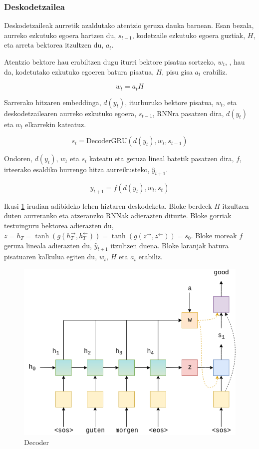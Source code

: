 \documentclass[11pt,a4paper]{article}
\begin{document}
\subsubsection{Deskodetzailea}
Deskodetzaileak aurretik azaldutako atentzio geruza dauka barnean. Esan bezala, aurreko ezkutuko egoera hartzen du, $s_{t-1}$, kodetzaile ezkutuko egoera guztiak, $H$, eta arreta bektorea itzultzen du, $a_t$.

Atentzio bektore hau erabiltzen dugu iturri bektore pisatua sortzeko, $w_t$, , hau da, kodetutako ezkutuko egoeren batura pisatua, $H$, pisu gisa $a_t$ erabiliz.

$$w_t = a_t H$$

Sarrerako hitzaren embeddinga, $d(y_t)$, iturburuko bektore pisatua, $w_t$, eta deskodetzailearen aurreko ezkutuko egoera, $s_{t-1}$, RNNra pasatzen dira, $d(y_t)$ eta $w_t$ elkarrekin kateatuz.

$$s_t = \text{DecoderGRU}(d(y_t), w_t, s_{t-1})$$

Ondoren, $d(y_t)$, $w_t$ eta $s_t$ kateatu eta geruza lineal batetik pasatzen dira, $f$, irteerako esaldiko hurrengo hitza aurreikusteko, $\hat{y}_{t+1}$.

$$\hat{y}_{t+1} = f(d(y_t), w_t, s_t)$$

Ikusi \ref{fig:decoder} irudian adibideko lehen hiztaren deskodeketa. Bloke berdeek $H$ itzultzen duten aurreranko eta atzeranzko RNNak adierazten dituzte. Bloke gorriak testuinguru bektorea adierazten du, $z = h_T = \tanh(g(h^\rightarrow_T,h^\leftarrow_T)) = \tanh(g(z^\rightarrow, z^\leftarrow)) = s_0$. Bloke moreak $f$ geruza lineala adierazten du, $\hat{y}_{t+1}$ itzultzen duena. Bloke laranjak batura pisatuaren kalkulua egiten du, $w_t$, $H$ eta $a_t$ erabiliz.

\begin{figure}[ht]
    \centering
    \includegraphics[width=\linewidth]{decoder}
    \caption{Decoder}
    \label{fig:decoder}
\end{figure}
\end{document}
